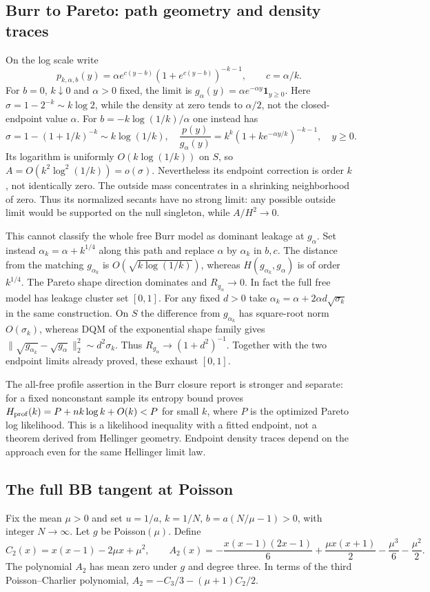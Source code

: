 \documentclass[11pt]{article}
\theoremstyle{definition}
\theoremstyle{remark}
\begin{document}
\subsection{Burr to Pareto: path geometry and density traces}
On the log scale write
\[
 p_{k,\alpha,b}(y)=\alpha e^{c(y-b)}(1+e^{c(y-b)})^{-k-1},\qquad c=\alpha/k.
\]
For $b=0$, $k\downarrow0$ and $\alpha>0$ fixed, the limit is
$g_\alpha(y)=\alpha e^{-\alpha y}\mathbf1_{y\ge0}$. Here
$\sigma=1-2^{-k}\sim k\log2$, while the density at zero tends to
$\alpha/2$, not the closed-endpoint value $\alpha$.
For $b=-k\log(1/k)/\alpha$ one instead has
\[
 \sigma=1-(1+1/k)^{-k}\sim k\log(1/k),\quad
 \frac{p(y)}{g_\alpha(y)}=k^k(1+ke^{-\alpha y/k})^{-k-1},\quad y\ge0.
\]
Its logarithm is uniformly
$O(k\log(1/k))$ on $S$, so $A=O(k^2\log^2(1/k))=o(\sigma)$.
Nevertheless its endpoint correction is order $k$, not identically zero.
The outside mass concentrates in a shrinking neighborhood of zero. Thus its
normalized secants have no strong limit: any possible outside limit would
be supported on the null singleton, while $A/H^2\to0$.

This cannot classify the whole free Burr model as dominant leakage at
$g_\alpha$. Set instead $\alpha_k=\alpha+k^{1/4}$ along this path and replace
$\alpha$ by $\alpha_k$ in $b,c$. The distance from the matching
$g_{\alpha_k}$ is $O(\sqrt{k\log(1/k)})$, whereas
$H(g_{\alpha_k},g_\alpha)$ is of order $k^{1/4}$. The Pareto shape direction
dominates and $R_{g_\alpha}\to0$.
In fact the full free model has leakage cluster set $[0,1]$. For any fixed
$d>0$ take $\alpha_k=\alpha+2\alpha d\sqrt{\sigma_k}$ in the same
construction. On $S$ the difference from $g_{\alpha_k}$ has square-root norm
$O(\sigma_k)$, whereas DQM of the exponential shape family gives
$\|\sqrt{g_{\alpha_k}}-\sqrt{g_\alpha}\|_2^2\sim d^2\sigma_k$.
Thus $R_{g_\alpha}\to(1+d^2)^{-1}$. Together with the two endpoint limits
already proved, these exhaust $[0,1]$.

The all-free profile assertion in the Burr closure report is stronger and
separate: for a fixed nonconstant sample its entropy bound proves
$H_{\rm prof}(k)=P+nk\log k+O(k)<P$ for small $k$, where $P$ is the
optimized Pareto log likelihood. This is a likelihood inequality with a fitted
endpoint, not a theorem derived from Hellinger geometry. Endpoint density
traces depend on the approach even for the same Hellinger limit law.

\subsection{The full BB tangent at Poisson}\label{sec:bb}
Fix the mean $\mu>0$ and set $u=1/a$, $k=1/N$,
$b=a(N/\mu-1)>0$, with integer $N\to\infty$. Let $g$ be Poisson$(\mu)$.
Define
\[
 C_2(x)=x(x-1)-2\mu x+\mu^2,\qquad
 A_2(x)=-\frac{x(x-1)(2x-1)}6+\frac{\mu x(x+1)}2
          -\frac{\mu^3}6-\frac{\mu^2}2.
\]
The polynomial $A_2$ has mean zero under $g$ and degree three. In terms of
the third Poisson--Charlier polynomial,
$A_2=-C_3/3-(\mu+1)C_2/2$.
\end{document}
